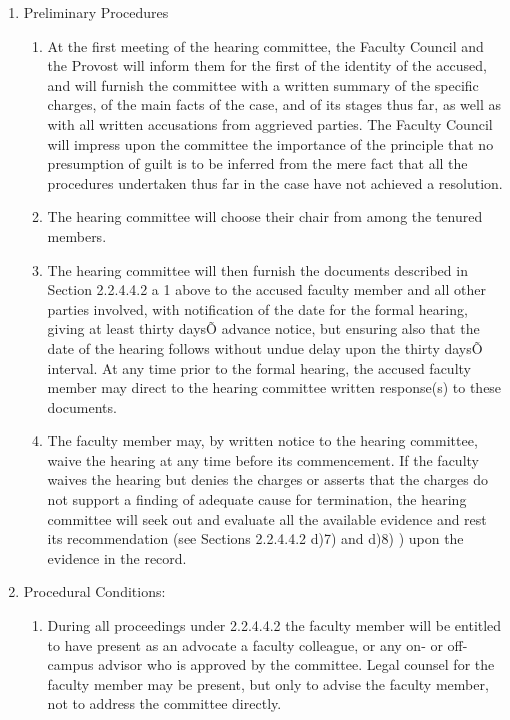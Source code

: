 \documentclass[letterpaper, 11pt]{article}
\begin{document}
				\begin{enumerate}[label=\alph*)]
					\item{Preliminary Procedures
						\begin{enumerate}[label=\arabic*)]
							\item{At the first meeting of the hearing committee, the Faculty Council and the Provost will inform them for the first of the identity of the accused, and will furnish the committee with a written summary of the specific charges, of the main facts of the case, and of its stages thus far, as well as with all written accusations from aggrieved parties. The Faculty Council will impress upon the committee the importance of the principle that no presumption of guilt is to be inferred from the mere fact that all the procedures undertaken thus far in the case have not achieved a resolution.}
							\item{The hearing committee will choose their chair from among the tenured members.}
							\item{The hearing committee will then furnish the documents described in Section 2.2.4.4.2 a 1 above to the accused faculty member and all other parties involved, with notification of the date for the formal hearing, giving at least thirty daysÕ advance notice, but ensuring also that the date of the hearing follows without undue delay upon the thirty daysÕ interval.  At any time prior to the formal hearing, the accused faculty member may direct to the hearing committee written response(s) to these documents.}
							\item{The faculty member may, by written notice to the hearing committee, waive the hearing at any time before its commencement.  If the faculty waives the hearing but denies the charges or asserts that the charges do not support a finding of adequate cause for termination, the hearing committee will seek out and evaluate all the available evidence and rest its recommendation (see Sections 2.2.4.4.2 d)7) and d)8) ) upon the evidence in the record.}
						\end{enumerate}
					}
					\item{Procedural Conditions:
						\begin{enumerate}[label=\arabic*)]
							\item{During all proceedings under 2.2.4.4.2 the faculty member will be entitled to have present as an advocate a faculty colleague, or any on- or off-campus advisor who is approved by the committee.  Legal counsel for the faculty member may be present, but only to advise the faculty member, not to address the committee directly.}

\end{enumerate}}
\end{enumerate}
\end{document}
